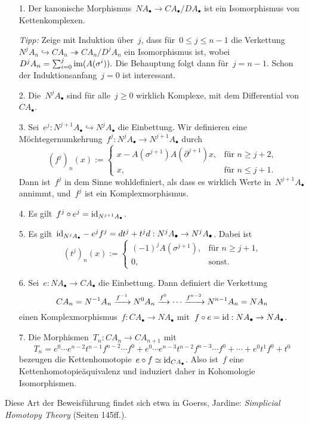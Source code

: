 \documentclass{uebblatt}
\begin{document}
\begin{enumerate}
\item[1.] Der kanonische Morphismus~$NA_\bullet \to CA_\bullet/DA_\bullet$ ist
ein Isomorphismus von Kettenkomplexen.

\emph{Tipp:} Zeige mit Induktion über~$j$, dass für~$0 \leq j \leq n-1$ die
Verkettung~$N^j A_n \hookrightarrow CA_n \twoheadrightarrow CA_n/D^jA_n$ ein
Isomorphismus ist, wobei~$D^j A_n = \sum_{i=0}^j \operatorname{im}(A(\sigma^i)).$
Die Behauptung folgt dann für~$j = n-1$. Schon der Induktionsanfang~$j = 0$ ist
interessant.

\item[2.] Die~$N^j A_\bullet$ sind für alle~$j \geq 0$ wirklich Komplexe, mit
dem Differential von~$CA_\bullet$.

\item[3.] Sei~$e^j : N^{j+1}A_\bullet \hookrightarrow N^jA_\bullet$ die
Einbettung. Wir definieren eine Möchtegernumkehrung~$f^j : N^jA_\bullet \to
N^{j+1}A_\bullet$ durch
\[ (f^j)_n(x) := \begin{cases}
  x - A(\sigma^{j+1}) A(\partial^{j+1})x, &
  \text{für $n \geq j+2$,} \\
  x, & \text{für $n \leq j+1$}. \end{cases} \]
Dann ist~$f^j$ in dem Sinne wohldefiniert, als dass es wirklich Werte
in~$N^{j+1}A_\bullet$ annimmt, und~$f^j$ ist ein Komplexmorphismus.

\item[4.] Es gilt~$f^j \circ e^j = \mathrm{id}_{N^{j+1}A_\bullet}$.

\item[5.] Es gilt~$\mathrm{id}_{N^jA_\bullet} - e^j f^j = d t^j + t^j d : N^jA_\bullet \to
N^jA_\bullet$. Dabei ist
\[ (t^j)_n(x) := \begin{cases}
  (-1)^j A(\sigma^{j+1}), & \text{für $n \geq j+1$,} \\
  0, & \text{sonst.} \end{cases} \]

\item[6.] Sei~$e : NA_\bullet \to CA_\bullet$ die Einbettung. Dann definiert
die Verkettung
\[ CA_n = N^{-1}A_n \xrightarrow{f^{-1}} N^0A_n \xrightarrow{f^0} \cdots \xrightarrow{f^{n-2}} N^{n-1}A_n =
NA_n \]
einen Komplexmorphismus~$f : CA_\bullet \to NA_\bullet$ mit~$f \circ e = \mathrm{id} :
NA_\bullet \to NA_\bullet$.

\item[7.] Die Morphismen~$T_n : CA_n \to CA_{n+1}$ mit
\[ T_n = e^0 \cdots e^{n-2} t^{n-1} f^{n-2} \cdots f^0 +
  e^0 \cdots e^{n-3} t^{n-2} f^{n-3} \cdots f^0 + \cdots +
  e^0 t^1 f^0 + t^0 \]
bezeugen die Kettenhomotopie~$e \circ f \simeq \mathrm{id}_{CA_\bullet}$. Also ist~$f$
eine Kettenhomotopieäquivalenz und induziert daher in Kohomologie
Isomorphismen.
\end{enumerate}

Diese Art der Beweisführung findet sich etwa in Goerss, Jardine:
\emph{Simplicial Homotopy Theory} (Seiten 145ff.).
\end{document}
